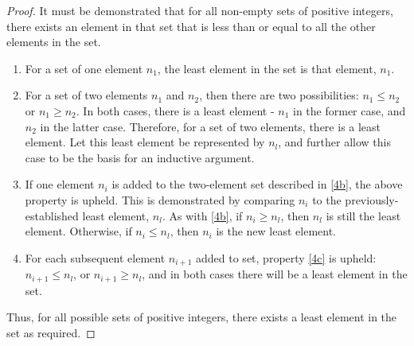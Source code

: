 \begin{proof}
	It must be demonstrated that for all non-empty sets of positive integers, there exists an element in that set that is less than or equal to all the other elements in the set.
	\begin{enumerate}[label=\textbf{\Roman*}]
		\item \label{4a} For a set of one element $n_1$, the least element in the set is that element, $n_1$.
		\item \label{4b} For a set of two elements $n_1$ and $n_2$, then there are two possibilities: $n_1 \leq n_2$ or $n_1 \geq n_2$. In both cases, there is a least element - $n_1$ in the former case, and $n_2$ in the latter case. Therefore, for a set of two elements, there is a least element. Let this least element be represented by $n_l$, and further allow this case to be the basis for an inductive argument.
		\item \label{4c} If one element $n_i$ is added to the two-element set described in \ref{4b}, the above property is upheld. This is demonstrated by comparing $n_i$ to the previously-established least element, $n_l$. As with \ref{4b}, if $n_i \geq n_l$, then $n_l$ is still the least element. Otherwise, if $n_i \leq n_l$, then $n_i$ is the new least element.
		\item \label{4d} For each subsequent element $n_{i+1}$ added to set, property \ref{4c} is upheld: $n_{i+1} \leq n_l$, or $n_{i+1} \geq n_l$, and in both cases there will be a least element in the set.
	\end{enumerate}
	Thus, for all possible sets of positive integers, there exists a least element in the set as required.
\end{proof}